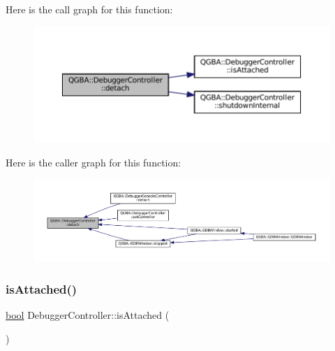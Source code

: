 Here is the call graph for this function\+:
\nopagebreak
\begin{figure}[H]
\begin{center}
\leavevmode
\includegraphics[width=350pt]{class_q_g_b_a_1_1_debugger_controller_a1154717cf3833d1d755687329d1fd093_cgraph}
\end{center}
\end{figure}
Here is the caller graph for this function\+:
\nopagebreak
\begin{figure}[H]
\begin{center}
\leavevmode
\includegraphics[width=350pt]{class_q_g_b_a_1_1_debugger_controller_a1154717cf3833d1d755687329d1fd093_icgraph}
\end{center}
\end{figure}
\mbox{\label{class_q_g_b_a_1_1_debugger_controller_aed5edc4c60b5c87a2a37c29079665f03}} 
\subsubsection{\texorpdfstring{is\+Attached()}{isAttached()}}
{\footnotesize\ttfamily \mbox{\hyperlink{libretro_8h_a4a26dcae73fb7e1528214a068aca317e}{bool}} Debugger\+Controller\+::is\+Attached (\begin{DoxyParamCaption}{ }\end{DoxyParamCaption})}

